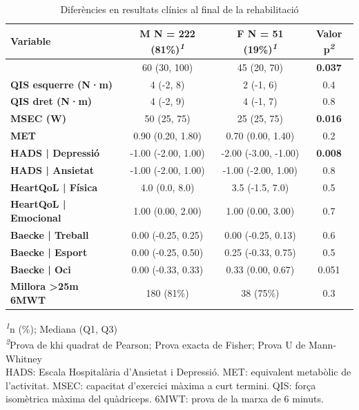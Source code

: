 \documentclass[CAT]{TFUOC}%
\begin{document}
\begin{table}[t]
\caption{\label{tab:table-res}Diferències en resultats clínics al final de la rehabilitació} 
\fontsize{12.0pt}{14.0pt}\selectfont
\begin{tabular*}{\linewidth}{@{\extracolsep{\fill}}lccc}
\toprule
\textbf{Variable} & \textbf{M} \textbar{} N = 222 (81\%)\textsuperscript{\textit{1}} & \textbf{F} \textbar{} N = 51 (19\%)\textsuperscript{\textit{1}} & \textbf{Valor p}\textsuperscript{\textit{2}} \\ 
\midrule\addlinespace[2.5pt]
{\bfseries 6MWT (m)} & 60 (30, 100) & 45 (20, 70) & {\bfseries 0.037} \\ 
{\bfseries QIS esquerre (N·m)} & 4 (-2, 8) & 2 (-1, 6) & 0.4 \\ 
{\bfseries QIS dret (N·m)} & 4 (-2, 9) & 4 (-1, 7) & 0.8 \\ 
{\bfseries MSEC (W)} & 50 (25, 75) & 25 (25, 75) & {\bfseries 0.016} \\ 
{\bfseries MET} & 0.90 (0.20, 1.80) & 0.70 (0.00, 1.40) & 0.2 \\ 
{\bfseries HADS | Depressió} & -1.00 (-2.00, 1.00) & -2.00 (-3.00, -1.00) & {\bfseries 0.008} \\ 
{\bfseries HADS | Ansietat} & -1.00 (-2.00, 1.00) & -1.00 (-2.00, 1.00) & 0.8 \\ 
{\bfseries HeartQoL | Física} & 4.0 (0.0, 8.0) & 3.5 (-1.5, 7.0) & 0.5 \\ 
{\bfseries HeartQoL | Emocional} & 1.00 (0.00, 2.00) & 1.00 (0.00, 3.00) & 0.7 \\ 
{\bfseries Baecke | Treball} & 0.00 (-0.25, 0.25) & 0.00 (-0.25, 0.13) & 0.6 \\ 
{\bfseries Baecke | Esport} & 0.00 (-0.25, 0.50) & 0.25 (-0.33, 0.75) & 0.5 \\ 
{\bfseries Baecke | Oci} & 0.00 (-0.33, 0.33) & 0.33 (0.00, 0.67) & 0.051 \\ 
{\bfseries Millora >25m 6MWT} & 180 (81\%) & 38 (75\%) & 0.3 \\ 
\bottomrule
\end{tabular*}
\begin{minipage}{\linewidth}
\vspace{.05em}
\textsuperscript{\textit{1}}n (\%); Mediana (Q1, Q3)\\
\textsuperscript{\textit{2}}Prova de khi quadrat de Pearson; Prova exacta de Fisher;
Prova U de Mann-Whitney\\
HADS: Escala Hospitalària d'Ansietat i Depressió. MET: equivalent metabòlic de l'activitat. MSEC: capacitat d'exercici màxima a curt termini. QIS: força isomètrica màxima del quàdriceps. 6MWT: prova de la marxa de 6 minuts.\\
\end{minipage}
\end{table}
\end{document}
